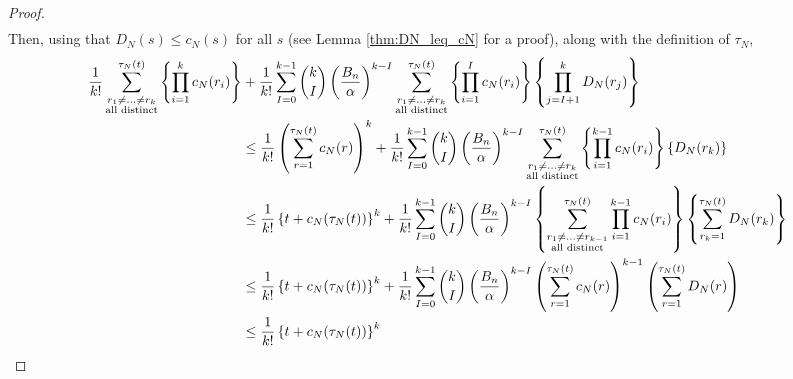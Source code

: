 \documentclass{article}
\newcommand{\1}[1]{\mathbb{I}_{#1}}
\begin{document}
\begin{proof}
\begin{align}
\label{eq:7}
\end{align}
Then, using that $D_N(s) \leq c_N(s)$ for all $s$ (see Lemma \ref{thm:DN_leq_cN} for a proof), along with the definition of $\tau_N$,
\begin{align}
\frac{1}{k!} \sum_{\substack{r_1\neq\dots\neq r_k \\\text{all distinct}}}^{\tau_N(t)} 
\left\{ \prod_{i=1}^{k} c_N(r_i) \right\} 
& + \frac{1}{k!}
\sum_{I=0}^{k-1}  \binom{k}{I}
\left( \frac{B_n}{\alpha} \right)^{k-I}
\sum_{\substack{r_1\neq\dots\neq r_k \\\text{all distinct}}}^{\tau_N(t)} 
\left\{ \prod_{i=1}^{I} c_N(r_i) \right\} \left\{ \prod_{j=I+1}^k D_N(r_j) \right\}\notag\\
&\leq  \frac{1}{k!} \left( \sum_{r=1}^{\tau_N(t)} c_N(r) \right)^k
+ \frac{1}{k!}
\sum_{I=0}^{k-1}  \binom{k}{I}
\left( \frac{B_n}{\alpha} \right)^{k-I}
\sum_{\substack{r_1\neq\dots\neq r_k \\\text{all distinct}}}^{\tau_N(t)} 
\left\{ \prod_{i=1}^{k-1} c_N(r_i) \right\} \left\{ D_N(r_k) \right\} \notag\\
&\leq  \frac{1}{k!} \left\{ t + c_N(\tau_N(t)) \right\}^k
+ \frac{1}{k!}
\sum_{I=0}^{k-1}  \binom{k}{I}
\left( \frac{B_n}{\alpha} \right)^{k-I}
\left\{ \sum_{\substack{r_1\neq\dots\neq r_{k-1} \\\text{all distinct}}}^{\tau_N(t)} 
\prod_{i=1}^{k-1} c_N(r_i) \right\} 
\left\{ \sum_{r_k =1}^{\tau_N(t)} D_N(r_k) \right\} \notag\\
&\leq  \frac{1}{k!} \left\{ t + c_N(\tau_N(t)) \right\}^k
+ \frac{1}{k!}
\sum_{I=0}^{k-1}  \binom{k}{I}
\left( \frac{B_n}{\alpha} \right)^{k-I}
\left( \sum_{r=1}^{\tau_N(t)} c_N(r) \right)^{k-1}
\left( \sum_{r=1}^{\tau_N(t)} D_N(r) \right) \notag\\
&\leq  \frac{1}{k!} \left\{ t + c_N(\tau_N(t)) \right\}^k

\end{align}
\end{proof}
\end{document}
